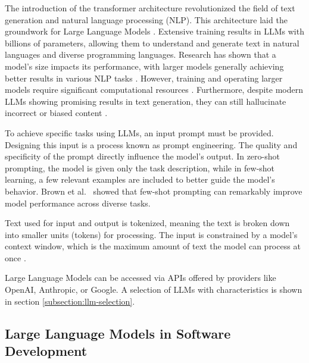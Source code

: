 The introduction of the transformer architecture revolutionized the field of text generation and natural language processing (NLP). This architecture laid the groundwork for Large Language Models \cite{changSurveyEvaluationLarge2024, naveedComprehensiveOverviewLarge2024}. Extensive training results in \acp{LLM} with billions of parameters, allowing them to understand and generate text in natural languages and diverse programming languages. Research has shown that a model's size impacts its performance, with larger models generally achieving better results in various NLP tasks \cite{kaplanScalingLawsNeural2020}. However, training and operating larger models require significant computational resources \cite{LLMsWhatsLarge, naveedComprehensiveOverviewLarge2024}. Furthermore, despite modern \acp{LLM} showing promising results in text generation, they can still hallucinate incorrect or biased content \cite{LLMsWhatsLarge}.

To achieve specific tasks using \acp{LLM}, an input prompt must be provided. Designing this input is a process known as prompt engineering. The quality and specificity of the prompt directly influence the model's output. In zero-shot prompting, the model is given only the task description, while in few-shot learning, a few relevant examples are included to better guide the model's behavior. Brown et al.~\cite{brownLanguageModelsAre2020} showed that few-shot prompting can remarkably improve model performance across diverse tasks.

Text used for input and output is tokenized, meaning the text is broken down into smaller units (tokens) for processing. The input is constrained by a model's context window, which is the maximum amount of text the model can process at once \cite{naveedComprehensiveOverviewLarge2024}.

Large Language Models can be accessed via APIs offered by providers like OpenAI, Anthropic, or Google. A selection of \acp{LLM} with characteristics is shown in section \ref{subsection:llm-selection}.

\subsection{Large Language Models in Software Development}

